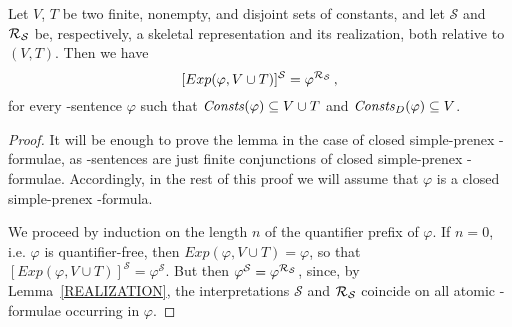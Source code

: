 \documentclass[manyauthors]{fundam}
\newcommand{\HExp}{Exp}
\newcommand{\atset}{\mathcal{S}}
\newcommand{\DomConsts}{\Consts_D}
\begin{document}
\begin{lemma}\label{SKREAL}
Let $V$, $T$ be two finite, nonempty, and disjoint sets of constants, and let
$\atset$ and $\Realization_{\!\atset}$ be, respectively, a skeletal 
representation and
its realization, both relative to $(V,T)$.
Then we have
\[
  [\HExp(\varphi, V \cup T)]^{\atset} = \varphi^{\Realization_{\!\atset}} \,,
\]
for every \Forallpizero-sentence $\varphi$ such that 
$\mathit{Consts}(\varphi) \subseteq V \cup T$
and $\DomConsts(\varphi) \subseteq V$.
\end{lemma}
\begin{proof}
It will be enough to prove the lemma in the case of closed simple-prenex
\Forallpizero-formulae, as \Forallpizero-sentences are just
finite conjunctions of closed simple-prenex \Forallpizero-formulae.
Accordingly, in the rest of this proof we will assume that $\varphi$
is a closed simple-prenex \Forallpizero-formula.

We proceed by induction on the length $n$ of the quantifier prefix of 
$\varphi$. If $n=0$, i.e. $\varphi$ is quantifier-free,
then $\HExp(\varphi, V \cup T)=\varphi$, so that $[\HExp(\varphi, V 
\cup T)]^\atset =\varphi^\atset$.
But then $\varphi^\atset = \varphi^{\Realization_{\!\atset}}$, since, 
by Lemma~\ref{REALIZATION},
the interpretations $\atset$ and $\Realization_{\!\atset}$ coincide 
on all atomic \Forallpizero-formulae occurring in $\varphi$.



\end{proof}
\end{document}
